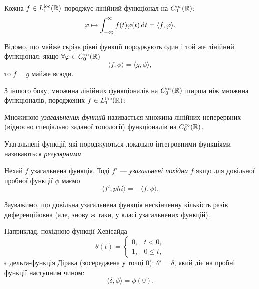 Кожна $f \in L_1^{\text{loc}}(\mathbb{R})$ породжує лінійний функціонал на $C_0^\infty(\mathbb{R})$:
\begin{equation}
    \varphi \mapsto \int_{-\infty}^\infty f(t) \varphi(t) \mathop{}\!\mathrm{d} t = \langle f, \varphi \rangle.
\end{equation}

Відомо, що майже скрізь рівні функції породжують один і той же лінійний функціонал:
якщо $\forall \varphi \in C_0^\infty(\mathbb{R})$
\begin{equation}
    \langle f, \phi \rangle = \langle g, \phi \rangle,
\end{equation}
то $f = g$ майже всюди. \medskip

З іншого боку, множина лінійних функціоналів на $C_0^\infty(\mathbb{R})$ ширша ніж множина функціоналів, породжених $f \in L_1^{\text{loc}}(\mathbb{R})$:

\begin{definition}
    Множиною \textit{узагальнених функцій} називається множина лінійних неперервних (відносно спеціально заданої топології) функціоналів на $C_0^\infty(\mathbb{R})$.
\end{definition}

\begin{definition}
    Узагальнені функції, які породжуються локально-інтегровними функціями називаються \textit{регулярними}.
\end{definition}

\begin{definition}
    Нехай $f$ узагальнена функція. Тоді $f'$ --- \textit{узагальнені похідна} $f$ якщо для довільної пробної функції $\phi$ маємо
    \begin{equation}
        \langle f', phi \rangle = - \langle f, \phi \rangle.
    \end{equation}
\end{definition}

\begin{remark}
    Зауважимо, що довільна узагальнена функція нескінченну кількість разів диференційовна (але, знову ж таки, у класі узагальнених функцій).
\end{remark}

\begin{remark}
    Наприклад, похідною функції Хевісайда
    \begin{equation}
        \theta(t) = \begin{cases}
            0, & t < 0, \\
            1, & 0 \le t,
        \end{cases}
    \end{equation}
    є дельта-функція Дірака (зосереджена у точці 0): $\theta' = \delta$, який діє на пробні функції наступним чином:
    \begin{equation}
        \langle \delta, \phi \rangle = \phi(0).
    \end{equation}
\end{remark}

